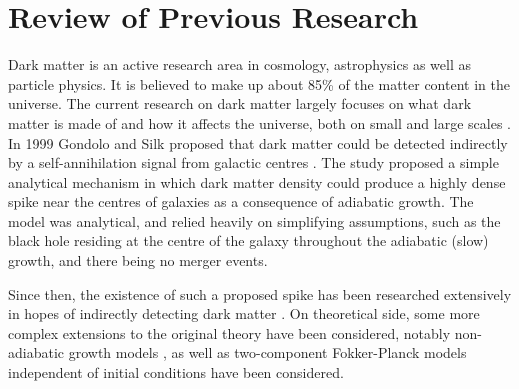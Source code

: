 \documentclass[a4paper,10pt]{article}
\begin{document}
\section{Review of Previous Research}







Dark matter is an active research area in cosmology, astrophysics as well as particle physics. It is believed to make up about 85\% of the matter 
content in the universe. The current research on dark matter largely focuses on what dark matter is made of and how it affects the universe, 
both on small and large scales \citep{this_probably_doesnt_need_a_citation}. In 1999 Gondolo and Silk proposed that dark matter could be detected 
indirectly by a self-annihilation signal from galactic centres \citep{GS_1999_original}. %
The study proposed a simple analytical mechanism in which dark matter density could produce a highly dense spike near the centres of galaxies 
as a consequence of adiabatic growth. The model was analytical, and relied heavily on simplifying assumptions, such as the black hole residing 
at the centre of the galaxy throughout the adiabatic (slow) growth, and there being no merger events. %

Since then, the existence of such a proposed spike has been researched extensively in hopes of 
indirectly detecting dark matter \citep{lots_of_citations_should_be_easy_to_find}. %
On theoretical side, some more complex extensions to the original theory have been considered, notably non-adiabatic growth models 
\citep{P_Ullio_2001}, as well as two-component Fokker-Planck models independent of initial conditions have been considered\citep{gnedin_primack_2004}. 
\end{document}
